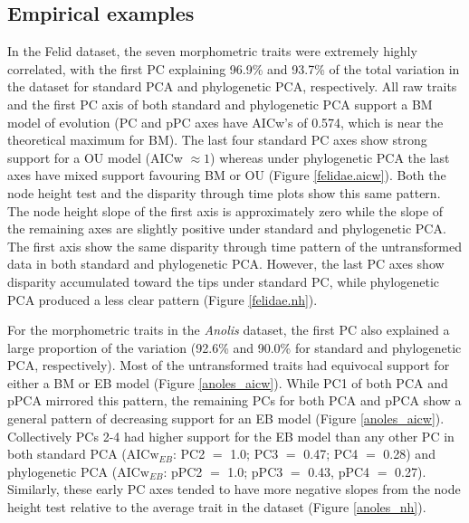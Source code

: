 \documentclass[a4paper,11pt]{article}
\begin{document}
\subsection{Empirical examples}
In the Felid dataset, the seven morphometric traits were extremely highly correlated, with the first PC explaining 96.9\% and 93.7\% of the total variation in the dataset for standard PCA and phylogenetic PCA, respectively. All raw traits and the first PC axis of both standard and phylogenetic PCA support a BM model of evolution (PC and pPC axes have AICw's of 0.574, which is near the theoretical maximum for BM). The last four standard PC axes show strong support for a OU model (AICw $\approx 1$) whereas under phylogenetic PCA the last axes have mixed support favouring BM or OU (Figure \ref{felidae.aicw}). Both the node height test and the disparity through time plots show this same pattern. The node height slope of the first axis is approximately zero while the slope of the remaining axes are slightly positive under standard and phylogenetic PCA. The first axis show the same disparity through time pattern of the untransformed data in both standard and phylogenetic PCA. However, the last PC axes show disparity accumulated toward the tips under standard PC, while phylogenetic PCA produced a less clear pattern (Figure \ref{felidae.nh}).

For the morphometric traits in the \textit{Anolis} dataset, the first PC also explained a large proportion of the variation (92.6\% and 90.0\% for standard and phylogenetic PCA, respectively). Most of the untransformed traits had equivocal support for either a BM or EB model (Figure \ref{anoles_aicw}). While PC1 of both PCA and pPCA mirrored this pattern, the remaining PCs for both PCA and pPCA show a general pattern of decreasing support for an EB model (Figure \ref{anoles_aicw}). Collectively PCs 2-4 had higher support for the EB model than any other PC in both standard PCA ($\text{AICw}_{EB}$: PC2 $=$ 1.0; PC3 $=$ 0.47; PC4 $=$ 0.28) and phylogenetic PCA ($\text{AICw}_{EB}$: pPC2 $=$ 1.0; pPC3 $=$ 0.43, pPC4 $=$ 0.27).  Similarly, these early PC axes tended to have more negative slopes from the node height test relative to the average trait in the dataset (Figure \ref{anoles_nh}).
\end{document}

